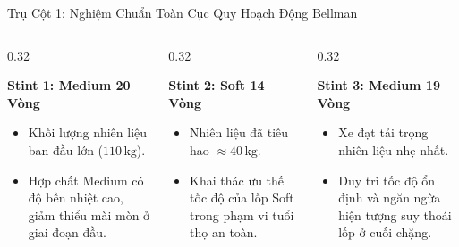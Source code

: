 \documentclass[aspectratio=169, 10pt]{beamer}
\begin{document}
\begin{frame}{Trụ Cột 1: Nghiệm Chuẩn Toàn Cục Quy Hoạch Động Bellman}
  \begin{columns}[T]
    \begin{column}{0.32\textwidth}
      \begin{block}{\centering \textbf{Stint 1: Medium 20 Vòng}}
        \scriptsize
        \begin{itemize}
          \item Khối lượng nhiên liệu ban đầu lớn ($110\,\text{kg}$).
          \item Hợp chất Medium có độ bền nhiệt cao, giảm thiểu mài mòn ở giai đoạn đầu.
        \end{itemize}
      \end{block}
    \end{column}

    \begin{column}{0.32\textwidth}
      \begin{block}{\centering \textbf{Stint 2: Soft 14 Vòng}}
        \scriptsize
        \begin{itemize}
          \item Nhiên liệu đã tiêu hao $\approx 40\,\text{kg}$.
          \item Khai thác ưu thế tốc độ của lốp Soft trong phạm vi tuổi thọ an toàn.
        \end{itemize}
      \end{block}
    \end{column}

    \begin{column}{0.32\textwidth}
      \begin{block}{\centering \textbf{Stint 3: Medium 19 Vòng}}
        \scriptsize
        \begin{itemize}
          \item Xe đạt tải trọng nhiên liệu nhẹ nhất.
          \item Duy trì tốc độ ổn định và ngăn ngừa hiện tượng suy thoái lốp ở cuối chặng.
        \end{itemize}
      \end{block}
    \end{column}
  \end{columns}
  \vspace{0.1cm}
  \centering
\end{frame}
\end{document}
